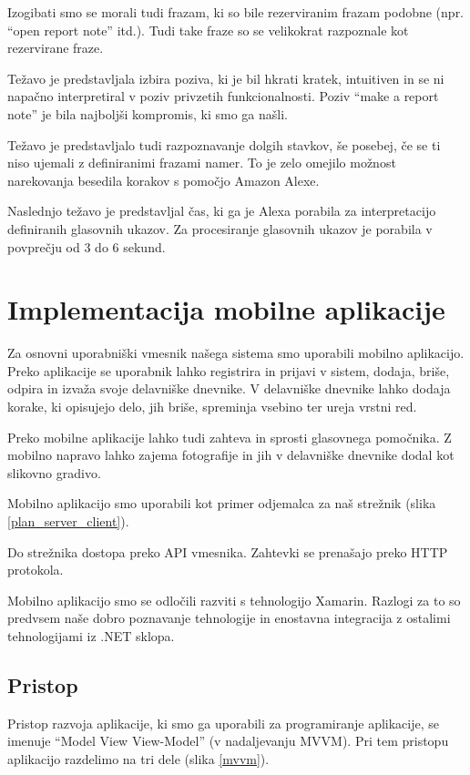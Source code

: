 \documentclass[a4paper, 12pt]{book}
\begin{document}
Izogibati smo se morali tudi frazam, ki so bile rezerviranim frazam podobne (npr. \enquote{open report note} itd.).
Tudi take fraze so se velikokrat razpoznale kot rezervirane fraze.

Težavo je predstavljala izbira poziva, ki je bil hkrati kratek, intuitiven in se ni napačno interpretiral v poziv privzetih funkcionalnosti.
Poziv \enquote{make a report note} je bila najboljši kompromis, ki smo ga našli.

Težavo je predstavljalo tudi razpoznavanje dolgih stavkov, še posebej, če se ti niso ujemali z definiranimi frazami namer.
To je zelo omejilo možnost narekovanja besedila korakov s pomočjo Amazon Alexe.

Naslednjo težavo je predstavljal čas, ki ga je Alexa porabila za interpretacijo definiranih glasovnih ukazov.
Za procesiranje glasovnih ukazov je porabila v povprečju od 3 do 6 sekund.

\section{Implementacija mobilne aplikacije}


Za osnovni uporabniški vmesnik našega sistema smo uporabili mobilno aplikacijo.
Preko aplikacije se uporabnik lahko registrira in prijavi v sistem, dodaja, briše, odpira in izvaža svoje delavniške dnevnike.
V delavniške dnevnike lahko dodaja korake, ki opisujejo delo, jih briše, spreminja vsebino ter ureja vrstni red.

Preko mobilne aplikacije lahko tudi zahteva in sprosti glasovnega pomočnika.
Z mobilno napravo lahko zajema fotografije in jih v delavniške dnevnike dodal kot slikovno gradivo.

Mobilno aplikacijo smo uporabili kot primer odjemalca za naš strežnik (slika \ref{plan_server_client}).

Do strežnika dostopa preko API vmesnika.
Zahtevki se prenašajo preko HTTP protokola.

Mobilno aplikacijo smo se odločili razviti s tehnologijo Xamarin.
Razlogi za to so predvsem naše dobro poznavanje tehnologije in enostavna integracija z ostalimi tehnologijami iz .NET sklopa.


\subsection{Pristop}
Pristop razvoja aplikacije, ki smo ga uporabili za programiranje aplikacije, se imenuje \enquote{Model View View-Model} (v nadaljevanju MVVM).
Pri tem pristopu aplikacijo razdelimo na tri dele (slika \ref{mvvm}).
\end{document}
